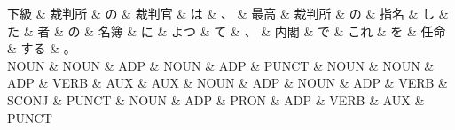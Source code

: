 \documentclass[tikz,border=5pt]{standalone}
\begin{document}
\normalsize
\begin{dependency}[edge unit distance=12.0pt]
    \begin{deptext}[column sep=1em]
        下級 \& 裁判所 \& の \& 裁判官 \& は \& 、 \& 最高 \& 裁判所 \& の \& 指名 \& し \& た \& 者 \& の \& 名簿 \& に \& よつ \& て \& 、 \& 内閣 \& で \& これ \& を \& 任命 \& する \& 。\\
        NOUN \& NOUN \& ADP \& NOUN \& ADP \& PUNCT \& NOUN \& NOUN \& ADP \& VERB \& AUX \& AUX \& NOUN \& ADP \& NOUN \& ADP \& VERB \& SCONJ \& PUNCT \& NOUN \& ADP \& PRON \& ADP \& VERB \& AUX \& PUNCT\\
    \end{deptext}
\end{dependency}
\end{document}

